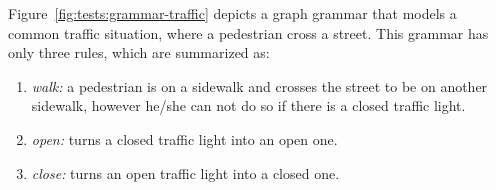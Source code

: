\begin{example} Figure~\ref{fig:tests:grammar-traffic} depicts a graph grammar that models a common traffic situation, where a pedestrian cross a street. This grammar has only three rules, which are summarized as:

\begin{enumerate}[label=(\alph*),start=2]
  \item \emph{walk:} a pedestrian is on a sidewalk and crosses the street to be on another sidewalk, however he/she can not do so if there is a closed traffic light.
  \item \emph{open:} turns a closed traffic light into an open one.
  \item \emph{close:} turns an open traffic light into a closed one.
\end{enumerate}
\end{example}

